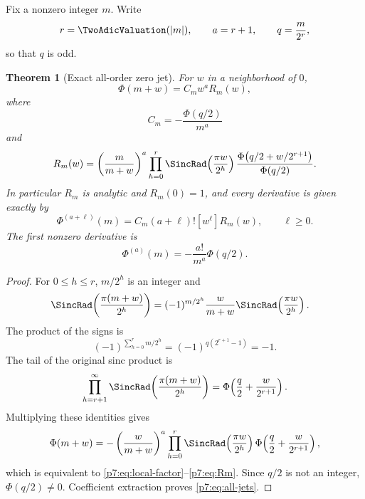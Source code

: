 \documentclass[11pt]{article}
\numberwithin{equation}{section}
\newtheorem{theorem}{Theorem}[section]
\theoremstyle{definition}
\theoremstyle{remark}
\begin{document}
Fix a nonzero integer $m$.  Write
\begin{equation}\label{p7:eq:m-rq}
 r=\TwoAdicValuation(|m|),\qquad a=r+1,\qquad q=\frac{m}{2^r},
\end{equation}
so that $q$ is odd.

\begin{theorem}[Exact all-order zero jet]\label{p7:thm:local-jet}
For $w$ in a neighborhood of $0$,
\begin{equation}\label{p7:eq:local-factor}
 \Phi(m+w)=C_mw^aR_m(w),
\end{equation}
where
\begin{equation}\label{p7:eq:Cm}
 \boxed{\ C_m=-\frac{\Phi(q/2)}{m^a}\ }
\end{equation}
and
\begin{equation}\label{p7:eq:Rm}
 R_m(w)=
 \left(\frac{m}{m+w}\right)^a
 \prod_{h=0}^{r}\SincRad\!\left(\frac{\pi w}{2^h}\right)
 \frac{\Phi\!\left(q/2+w/2^{r+1}\right)}{\Phi(q/2)}.
\end{equation}
In particular $R_m$ is analytic and $R_m(0)=1$, and every derivative is given exactly by
\begin{equation}\label{p7:eq:all-jets}
 \boxed{\ \Phi^{(a+\ell)}(m)
 =C_m(a+\ell)![w^\ell]R_m(w),\qquad \ell\ge0.\ }
\end{equation}
The first nonzero derivative is
\begin{equation}\label{p7:eq:first-derivative-zero}
 \boxed{\ \Phi^{(a)}(m)=-\frac{a!}{m^a}\Phi(q/2).\ }
\end{equation}
\end{theorem}

\begin{proof}
For $0\le h\le r$, $m/2^h$ is an integer and
\begin{align*}
 \SincRad\!\left(\frac{\pi(m+w)}{2^h}\right)
 &=(-1)^{m/2^h}\frac{w}{m+w}
   \SincRad\!\left(\frac{\pi w}{2^h}\right).
\end{align*}
The product of the signs is
\[
 (-1)^{\sum_{h=0}^{r}m/2^h}
 =(-1)^{q(2^{r+1}-1)}=-1.
\]
The tail of the original sinc product is
\[
 \prod_{h=r+1}^{\infty}
 \SincRad\!\left(\frac{\pi(m+w)}{2^h}\right)
 =\Phi\!\left(\frac q2+\frac{w}{2^{r+1}}\right).
\]
Multiplying these identities gives
\[
 \Phi(m+w)=-\left(\frac{w}{m+w}\right)^a
 \prod_{h=0}^{r}\SincRad\!\left(\frac{\pi w}{2^h}\right)
 \Phi\!\left(\frac q2+\frac{w}{2^{r+1}}\right),
\]
which is equivalent to \cref{p7:eq:local-factor}--\cref{p7:eq:Rm}.  Since $q/2$ is not an integer, $\Phi(q/2)\ne0$.  Coefficient extraction proves \cref{p7:eq:all-jets}.
\end{proof}
\end{document}
